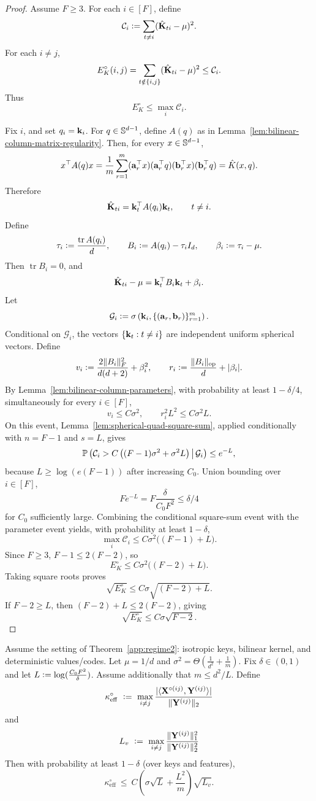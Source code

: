 \begin{proof}
Assume
\(F\ge3\). For each \(i\in[F]\), define
\[
\mathcal C_i
\vcentcolon=
\sum_{t\neq i}(\hat{\mathbf{K}}_{ti}-\mu)^2.
\]
For each \(i\neq j\),
\[
E_K^\circ(i,j)
=
\sum_{t\notin\{i,j\}}(\hat{\mathbf{K}}_{ti}-\mu)^2
\le
\mathcal C_i.
\]
Thus
\[
E_K^\circ\le \max_i\mathcal C_i.
\]

Fix \(i\), and set \(q_i={\mathbf{k}}_i\). For \(q\in\mathbb{S}^{d-1}\), define \(A(q)\) as in
Lemma~\ref{lem:bilinear-column-matrix-regularity}. Then, for every \(x\in\mathbb{S}^{d-1}\),
\[
x^\top A(q)x
=
\frac1m\sum_{r=1}^m
({\mathbf{a}}_r^\top x)({\mathbf{a}}_r^\top q)({\mathbf{b}}_r^\top x)({\mathbf{b}}_r^\top q)
=
\hat K(x,q).
\]
Therefore
\[
\hat{\mathbf{K}}_{ti}={\mathbf{k}}_t^\top A(q_i){\mathbf{k}}_t,
\qquad t\neq i.
\]
Define
\[
\tau_i\vcentcolon= \frac{\operatorname{tr}A(q_i)}{d},
\qquad
B_i\vcentcolon= A(q_i)-\tau_iI_d,
\qquad
\beta_i\vcentcolon= \tau_i-\mu.
\]
Then \(\operatorname{tr}B_i=0\), and
\[
\hat{\mathbf{K}}_{ti}-\mu
=
{\mathbf{k}}_t^\top B_i{\mathbf{k}}_t+\beta_i.
\]
Let
\[
\mathcal G_i
\vcentcolon=
\sigma\left({\mathbf{k}}_i,\{({\mathbf{a}}_r,{\mathbf{b}}_r)\}_{r=1}^m\right).
\]
Conditional on \(\mathcal G_i\), the vectors \(\{{\mathbf{k}}_t:t\neq i\}\) are independent
uniform spherical vectors. Define
\[
v_i\vcentcolon= \frac{2\|B_i\|_F^2}{d(d+2)}+\beta_i^2,
\qquad
r_i\vcentcolon= \frac{\|B_i\|_{\mathrm{op}}}{d}+|\beta_i|.
\]
By Lemma~\ref{lem:bilinear-column-parameters}, with probability at least
\(1-\delta/4\), simultaneously for every \(i\in[F]\),
\[
v_i\le C\sigma^2,
\qquad
r_i^2L^2\le C\sigma^2L.
\]
On this event, Lemma~\ref{lem:spherical-quad-square-sum}, applied conditionally
with \(n=F-1\) and \(s=L\), gives
\[
\mathbb{P}\left(
\mathcal C_i
>
C\left((F-1)\sigma^2+\sigma^2L\right)
\,\middle|\,
\mathcal G_i
\right)
\le e^{-L},
\]
because \(L\ge \log(e(F-1))\) after increasing \(C_0\). Union bounding over
\(i\in[F]\),
\[
Fe^{-L}
=
F\frac{\delta}{C_0F^2}
\le
\delta/4
\]
for \(C_0\) sufficiently large. Combining the conditional square-sum event with
the parameter event yields, with probability at least \(1-\delta\),
\[
\max_i\mathcal C_i
\le
C\sigma^2\bigl((F-1)+L\bigr).
\]
Since \(F\ge3\), \(F-1\le2(F-2)\), so
\[
E_K^\circ
\le
C\sigma^2\bigl((F-2)+L\bigr).
\]
Taking square roots proves
\[
\sqrt{E_K^\circ}
\le
C\sigma\sqrt{(F-2)+L}.
\]
If \(F-2\ge L\), then \((F-2)+L\le2(F-2)\), giving
\[
\sqrt{E_K^\circ}
\le
C\sigma\sqrt{F-2}.
\]
\end{proof}



\begin{lemma}
\label{lem:keff-iso-keys}
Assume the setting of Theorem~\ref{app:regime2}: isotropic keys, bilinear kernel, and deterministic values/codes.
Let $\mu=1/d$ and $\sigma^2=\Theta(\tfrac{1}{d^2}+\tfrac{1}{m})$.
Fix $\delta\in(0,1)$ and let $L\vcentcolon= \log(\tfrac{C_{0} F^2}{\delta})$.
Assume additionally that $m\le d^2/L$.
Define
\[
\kappa_{\mathrm{eff}}^\circ
\ \vcentcolon=\
\max_{i\neq j}\frac{|\langle {\mathbf{X}^{\circ(ij)}}, {\mathbf{Y}^{(ij)}} \rangle|}{\|\mathbf{Y}^{(ij)}\|_2}
\]
and
\[
L_{v}\ \vcentcolon=\ \max_{i\neq j}\frac{\|\mathbf{Y}^{(ij)}\|_{1}^2}{\|\mathbf{Y}^{(ij)}\|_{2}^2}
\]
Then with probability at least $1-\delta$ (over keys and features),
\[
\kappa_{\mathrm{eff}}^\circ
\ \le\
C\left(\sigma\sqrt{L}+\frac{L^2}{m}\right)\sqrt{L_v}.
\]
\end{lemma}

